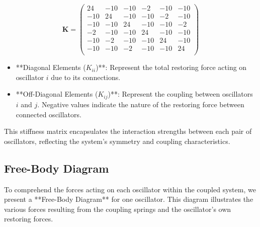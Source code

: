 \documentclass[12pt]{report} %
\begin{document}
    \[
    \mathbf{K} = 
    \begin{pmatrix}
    24 & -10 & -10 & -2 & -10 & -10 \\
    -10 & 24 & -10 & -10 & -2 & -10 \\
    -10 & -10 & 24 & -10 & -10 & -2 \\
    -2 & -10 & -10 & 24 & -10 & -10 \\
    -10 & -2 & -10 & -10 & 24 & -10 \\
    -10 & -10 & -2 & -10 & -10 & 24 \\
    \end{pmatrix}
    \]
    
    \begin{itemize}
        \item **Diagonal Elements (\( K_{ii} \))**: Represent the total restoring force acting on oscillator \( i \) due to its connections.
        \item **Off-Diagonal Elements (\( K_{ij} \))**: Represent the coupling between oscillators \( i \) and \( j \). Negative values indicate the nature of the restoring force between connected oscillators.
    \end{itemize}
    
    This stiffness matrix encapsulates the interaction strengths between each pair of oscillators, reflecting the system's symmetry and coupling characteristics.
    
    \subsection{Free-Body Diagram}
    \label{subsec:part2_task1_fbd}
    
    To comprehend the forces acting on each oscillator within the coupled system, we present a **Free-Body Diagram** for one oscillator. This diagram illustrates the various forces resulting from the coupling springs and the oscillator's own restoring forces.
    
\end{document}

